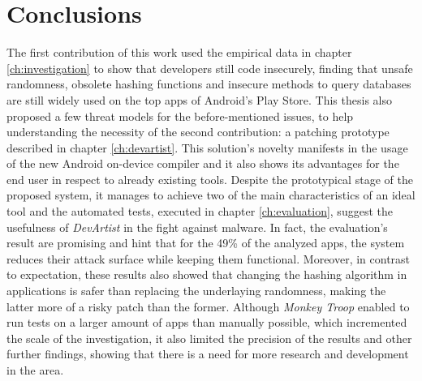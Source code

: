 \chapter{Conclusions}
The first contribution of this work used the empirical data in chapter \ref{ch:investigation} to show that developers still code insecurely, finding that unsafe randomness, obsolete hashing functions and insecure methods to query databases are still widely used on the top apps of Android's Play Store. This thesis also proposed a few threat models for the before-mentioned issues, to help understanding the necessity of the second contribution: a patching prototype described in chapter \ref{ch:devartist}. This solution's novelty manifests in the usage of the new Android on-device compiler and it also shows its advantages for the end user in respect to already existing tools. Despite the prototypical stage of the proposed system, it manages to achieve two of the main characteristics of an ideal tool and the automated tests, executed in chapter \ref{ch:evaluation}, suggest the usefulness of \emph{DevArtist} in the fight against malware. In fact, the evaluation's result are promising and hint that for the 49\% of the analyzed apps, the system reduces their attack surface while keeping them functional. Moreover, in contrast to expectation, these results also showed that changing the hashing algorithm in applications is safer than replacing the underlaying randomness, making the latter more of a risky patch than the former. Although \emph{Monkey Troop} enabled to run tests on a larger amount of apps than manually possible, which incremented the scale of the investigation, it also limited the precision of the results and other further findings, showing that there is a need for more research and development in the area.







     